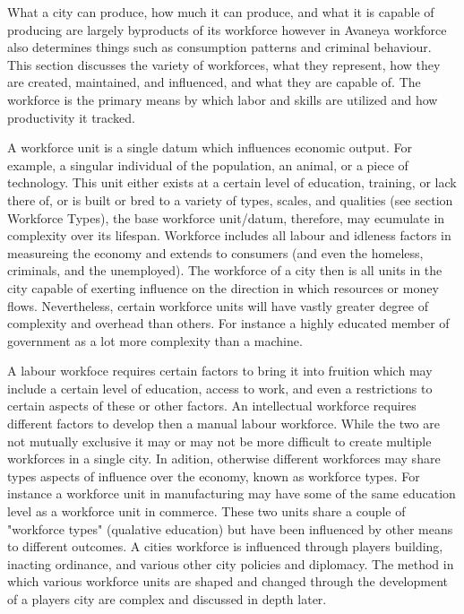 


What a city can produce, how much it can produce, and what it is capable of producing are largely byproducts of its workforce however in Avaneya workforce also determines things such as consumption patterns and criminal behaviour. This section discusses the variety of workforces, what they represent, how they are created, maintained, and influenced, and what they are capable of. The workforce is the primary means by which labor and skills are utilized and how productivity it tracked.

A workforce unit is a single datum which influences economic output. For example, a singular individual of the population, an animal, or a piece of technology. This unit either exists at a certain level of education, training, or lack there of, or is built or bred to a variety of types, scales, and qualities (see section Workforce Types), the base workforce unit/datum, therefore, may ecumulate in complexity over its lifespan. Workforce includes all labour and idleness factors in measureing the economy and extends to consumers (and even the homeless, criminals, and the unemployed). The workforce of a city then is all units in the city capable of exerting influence on the direction in which resources or money flows. Nevertheless, certain workforce units will have vastly greater degree of complexity and overhead than others. For instance a highly educated member of government as a lot more complexity than a machine. %

A labour workfoce requires certain factors to bring it into fruition which may include a certain level of education, access to work, and even a restrictions to certain aspects of these or other factors. An intellectual workforce requires different factors to develop then a manual labour workforce. While the two are not mutually exclusive it may or may not be more difficult to create multiple workforces in a single city. In adition, otherwise different workforces may share types aspects of influence over the economy, known as workforce types. For instance a workforce unit in manufacturing may have some of the same education level as a workforce unit in commerce. These two units share a couple of "workforce types" (qualative education) but have been influenced by other means to different outcomes. A cities workforce is influenced through players building, inacting ordinance, and various other  city policies and diplomacy. The method in which various workforce units are shaped and changed through the development of a players city are complex and discussed in depth later.

